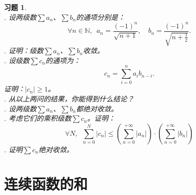 \documentclass[12pt,UTF8]{ctexbook}
\theoremstyle{definition}
\theoremstyle{plain}
\newtheorem{xt}{习题}[section]
\begin{document}
\begin{xt}
    \mbox{} \\
    . 设两级数$\sum a_n$、$\sum b_n$的通项分别是：
    $$ \forall n\in\mathbb{N}, \,\,\, a_n = \frac{(-1)^n}{\sqrt{n+1}}, \quad b_n = \frac{(-1)^n}{\sqrt{n+\frac{1}{2}}}. $$
    . 证明：级数$\sum a_n$、$\sum b_n$收敛。\\
    . 设级数$\sum c_n$的通项为：
    $$ c_n = \sum_{i=0}^n a_i b_{n-i} . $$
    \indent 证明：$|c_n| \geqslant 1$。\\
    . 从以上两问的结果，你能得到什么结论？\\
    . 设两级数$\sum a_n$、$\sum b_n$都绝对收敛。\\
    . 考虑它们的乘积级数$\sum c_n$。证明：
    $$ \forall N, \,\,\, \sum_{n=0}^{N} |c_n| \leqslant \left(\sum_{n=0}^{+\infty} |a_n| \right) \cdot \left(\sum_{n=0}^{+\infty} |b_n| \right)$$
    . 证明$\sum c_n$绝对收敛。
\end{xt}

\chapter{连续函数的和}
\end{document}
